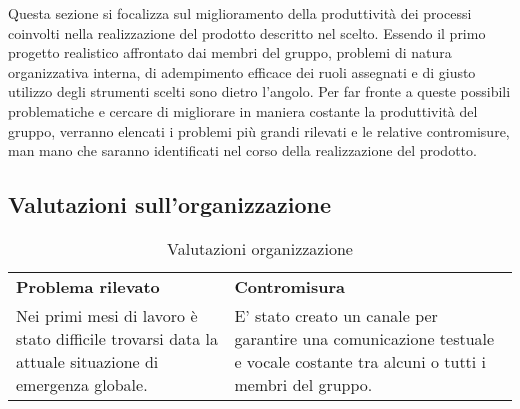 Questa sezione si focalizza sul miglioramento della produttività dei processi coinvolti nella
realizzazione del prodotto descritto nel  scelto. Essendo il primo progetto realistico affrontato dai membri del gruppo, problemi di natura organizzativa interna, di adempimento efficace
dei ruoli assegnati e di giusto utilizzo degli strumenti scelti sono dietro l’angolo. Per far fronte a queste
possibili problematiche e cercare di migliorare in maniera costante la produttività del gruppo, verranno elencati i problemi più grandi rilevati e le relative contromisure, man mano che saranno identificati
nel corso della realizzazione del prodotto.

\subsection{Valutazioni sull'organizzazione}
\begin{table} [h!]
	\begin{center}
		\begin{tabular} { m{8cm} m{8cm}  }
			\rowcolor{lightgray}
			\textbf{Problema rilevato} & \textbf{Contromisura}\\
			Nei primi mesi di lavoro è stato difficile trovarsi data la attuale situazione di emergenza globale. & E' stato creato un canale \glock{discord} per garantire una comunicazione testuale e vocale costante tra alcuni o tutti i membri del gruppo.
			
		\end{tabular}
	\end{center}
	\caption{Valutazioni organizzazione}
\end{table}

